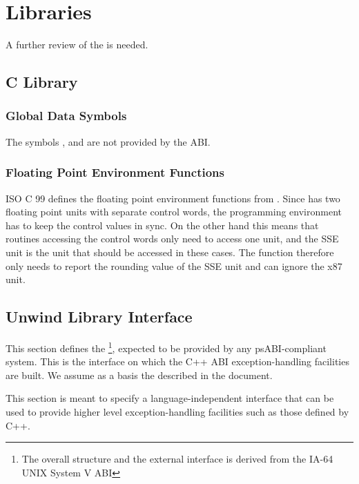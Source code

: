 \chapter{Libraries}

A further review of the \intelabi is needed.

\section{C Library}

\subsection{Global Data Symbols}

The symbols ,  and 
are not provided by the \xARCH ABI.

\subsection{Floating Point Environment Functions}

ISO C 99 defines the floating point environment functions from
.  Since \xARCH has two floating point units with
separate control words, the programming environment has to keep the
control values in sync.  On the other hand this means that routines
accessing the control words only need to access one unit, and the SSE
unit is the unit that should be accessed in these cases.  The
function  therefore only needs to report the
rounding value of the SSE unit and can ignore the x87 unit.

\section{Unwind Library Interface\label{unwindlib}}

This section defines the %
\footnote{The overall structure and the external interface is derived
from the IA-64 UNIX System V ABI},
expected to be provided by any \xARCH psABI-compliant system.
This is the interface on which the C++ ABI exception-handling
facilities are built. We assume as a basis the
 described in the
 document.

This section is meant to specify a language-independent interface that
can be used to provide higher level exception-handling facilities such
as those defined by C++.

